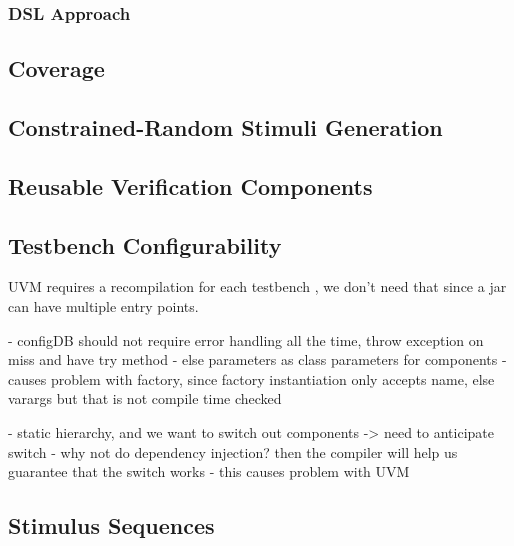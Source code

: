 \documentclass[12pt]{report}
\begin{document}
\subsubsection{DSL Approach}

\subsection{Coverage} %

\subsection{Constrained-Random Stimuli Generation} %

\subsection{Reusable Verification Components} %

\subsection{Testbench Configurability} %

UVM requires a recompilation for each testbench \cite{salemi2013uvm}, we don't need that since a jar can have
multiple entry points.

- configDB should not require error handling all the time, throw exception on miss and have try method
- else parameters as class parameters for components
- causes problem with factory, since factory instantiation only accepts name, else varargs but that is not compile time checked

- static hierarchy, and we want to switch out components -> need to anticipate switch
- why not do dependency injection? then the compiler will help us guarantee that the switch works
- this causes problem with UVM

\subsection{Stimulus Sequences} %
\end{document}
